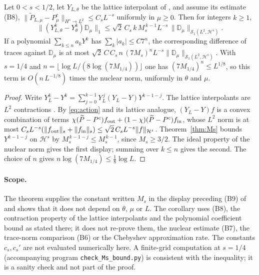 \documentclass[11pt,a4paper]{article}
\theoremstyle{definition}\newtheorem{definition}[theorem]{Definition}
\begin{document}
\begin{corollary}\label{cor:B9}
Let $0<s<1/2$, let $Y_{L,\theta}$ be the lattice interpolant of \cite{cross}, and assume its estimate (B8), $\|\widetilde P_{L,\mu}-P_\mu^c\|_{H^s\to L^2}\le C_sL^{-s}$ uniformly in $\mu\ge0$. Then for integers $k\ge1$,
\[
\bigl\|(Y_{L,\theta}^k-Y_\theta^k)\mathbb D_\mu\bigr\|_1\le \sqrt2\,C_s\,k\,M_s^{\,k-1}L^{-s}\,\|\mathbb D_\mu\|_{\mathcal S_1(L^2,\mathcal H^s)} .
\]
If a polynomial $\sum_{k\le n}a_kY^k$ has $\sum_k|a_k|\le C7^n$, the corresponding difference of traces against $\mathbb D_\mu$ is at most $\sqrt2\,C\,C_s\,n\,(7M_s)^nL^{-s}\|\mathbb D_\mu\|_{\mathcal S_1(L^2,\mathcal H^s)}$. With $s=1/4$ and $n=\lfloor\log L/(8\log(7M_{1/4}))\rfloor$ one has $(7M_{1/4})^n\le L^{1/8}$, so this term is $O(n\,L^{-1/8})$ times the nuclear norm, uniformly in $\theta$ and $\mu$.
\end{corollary}
\begin{proof}
Write $Y_{L}^k-Y^k=\sum_{j=0}^{k-1}Y_L^{\,j}(Y_L-Y)Y^{k-1-j}$. The lattice interpolants are $L^2$ contractions \cite{cross}. By \eqref{eq:action} and its lattice analogue, $(Y_L-Y)f$ is a convex combination of terms $\chi(\widetilde P-P^c)f_{\rm out}+(1-\chi)(\widetilde P-P^c)f_{\rm in}$, whose $L^2$ norm is at most $C_sL^{-s}(\|f_{\rm out}\|_s+\|f_{\rm in}\|_s)\le\sqrt2\,C_sL^{-s}\|f\|_{\mathcal H^s}$. Theorem~\ref{thm:Ms} bounds $Y^{k-1-j}$ on $\mathcal H^s$ by $M_s^{\,k-1-j}\le M_s^{\,k-1}$, since $M_s\ge3/2$. The ideal property of the nuclear norm gives the first display; summing over $k\le n$ gives the second. The choice of $n$ gives $n\log(7M_{1/4})\le\tfrac18\log L$.
\end{proof}

\paragraph{Scope.} The theorem supplies the constant written $M_s$ in the display preceding (B9) of \cite{cross} and shows that it does not depend on $\theta$, $\mu$ or $L$. The corollary uses (B8), the contraction property of the lattice interpolants and the polynomial coefficient bound as stated there; it does not re-prove them, the nuclear estimate (B7), the trace-norm comparison (B6) or the Chebyshev approximation rate. The constants $c_s,c_s'$ are not evaluated numerically here. A finite-grid computation at $s=1/4$ (accompanying program \texttt{check\_Ms\_bound.py}) is consistent with the inequality; it is a sanity check and not part of the proof.
\end{document}
